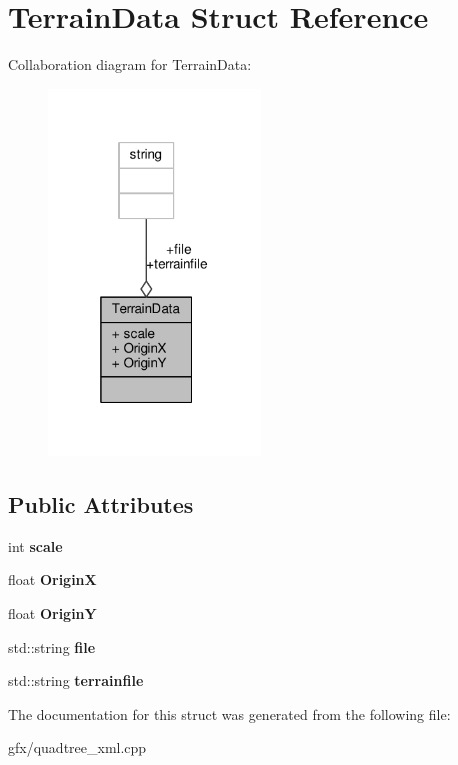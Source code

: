 \hypertarget{structTerrainData}{}\section{Terrain\+Data Struct Reference}
\label{structTerrainData}


Collaboration diagram for Terrain\+Data\+:
\nopagebreak
\begin{figure}[H]
\begin{center}
\leavevmode
\includegraphics[width=160pt]{d8/d18/structTerrainData__coll__graph}
\end{center}
\end{figure}
\subsection*{Public Attributes}
\begin{DoxyCompactItemize}
\item 
int {\bfseries scale}\hypertarget{structTerrainData_ac4e730e8d2783e4042fc1e925dbd63eb}{}\label{structTerrainData_ac4e730e8d2783e4042fc1e925dbd63eb}

\item 
float {\bfseries OriginX}\hypertarget{structTerrainData_a1654a6cbc6688ac7bf5e40092e62e376}{}\label{structTerrainData_a1654a6cbc6688ac7bf5e40092e62e376}

\item 
float {\bfseries OriginY}\hypertarget{structTerrainData_a67f0b2ab6fcc01a0ac59fe7e606a99e0}{}\label{structTerrainData_a67f0b2ab6fcc01a0ac59fe7e606a99e0}

\item 
std\+::string {\bfseries file}\hypertarget{structTerrainData_a7c732f336ab714359f8910c7ca611260}{}\label{structTerrainData_a7c732f336ab714359f8910c7ca611260}

\item 
std\+::string {\bfseries terrainfile}\hypertarget{structTerrainData_a267195aab9f0ae8d4f3dbe5b609f11b2}{}\label{structTerrainData_a267195aab9f0ae8d4f3dbe5b609f11b2}

\end{DoxyCompactItemize}


The documentation for this struct was generated from the following file\+:\begin{DoxyCompactItemize}
\item 
gfx/quadtree\+\_\+xml.\+cpp\end{DoxyCompactItemize}
